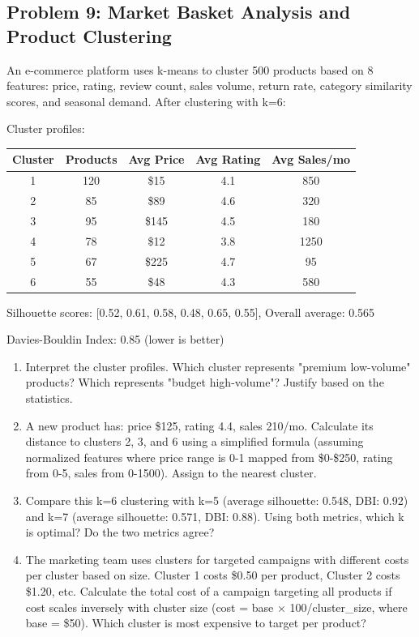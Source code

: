 \documentclass[12pt]{article}
\begin{document}
\subsection*{Problem 9: Market Basket Analysis and Product Clustering}

An e-commerce platform uses k-means to cluster 500 products based on 8 features: price, rating, review count, sales volume, return rate, category similarity scores, and seasonal demand. After clustering with k=6:

Cluster profiles:
\begin{center}
\begin{tabular}{ccccc}
\toprule
Cluster & Products & Avg Price & Avg Rating & Avg Sales/mo \\
\midrule
1 & 120 & \$15 & 4.1 & 850 \\
2 & 85 & \$89 & 4.6 & 320 \\
3 & 95 & \$145 & 4.5 & 180 \\
4 & 78 & \$12 & 3.8 & 1250 \\
5 & 67 & \$225 & 4.7 & 95 \\
6 & 55 & \$48 & 4.3 & 580 \\
\bottomrule
\end{tabular}
\end{center}

Silhouette scores: [0.52, 0.61, 0.58, 0.48, 0.65, 0.55], Overall average: 0.565

Davies-Bouldin Index: 0.85 (lower is better)

\begin{enumerate}[label=(\alph*)]
\item Interpret the cluster profiles. Which cluster represents "premium low-volume" products? Which represents "budget high-volume"? Justify based on the statistics.

\item A new product has: price \$125, rating 4.4, sales 210/mo. Calculate its distance to clusters 2, 3, and 6 using a simplified formula (assuming normalized features where price range is 0-1 mapped from \$0-\$250, rating from 0-5, sales from 0-1500). Assign to the nearest cluster.

\item Compare this k=6 clustering with k=5 (average silhouette: 0.548, DBI: 0.92) and k=7 (average silhouette: 0.571, DBI: 0.88). Using both metrics, which k is optimal? Do the two metrics agree?

\item The marketing team uses clusters for targeted campaigns with different costs per cluster based on size. Cluster 1 costs \$0.50 per product, Cluster 2 costs \$1.20, etc. Calculate the total cost of a campaign targeting all products if cost scales inversely with cluster size (cost = base × 100/cluster\_size, where base = \$50). Which cluster is most expensive to target per product?
\end{enumerate}
\end{document}
